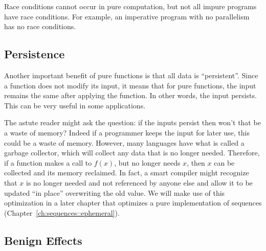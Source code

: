 \begin{gram}
Race conditions cannot occur in pure computation, but not all
impure programs have race conditions.  For example, an imperative
program with no parallelism has no race conditions.
\end{gram}

\subsection{Persistence}
\begin{gram}
Another important benefit of pure functions is that all data is
``persistent''.   Since a function does not modify its input, it means
that for pure functions, the input remains the same after applying the
function.   In other words, the input persists.     This can be very
useful in some applications.
\end{gram}

\begin{remark}
  The astute reader might ask the question: if the inputs persist then won't that
  be a waste of memory?  Indeed if a programmer keeps the input for later use, this
  could be a waste of memory.  However, many languages
  have what is called a garbage collector, which will collect any data
  that is no longer needed.  Therefore, if a function makes a call to
  $f(x)$, but no longer needs $x$, then $x$
  can be collected and its memory reclaimed.   In fact, a smart
  compiler might recognize that
  $x$ is no longer needed and not referenced by anyone else and allow it to be updated ``in place''
  overwriting the old value.    We will make use of this optimization
  in a later chapter that optimizes a pure implementation of sequences (Chapter~\ref{ch:sequences::ephemeral}).
\end{remark}



\subsection{Benign Effects}

